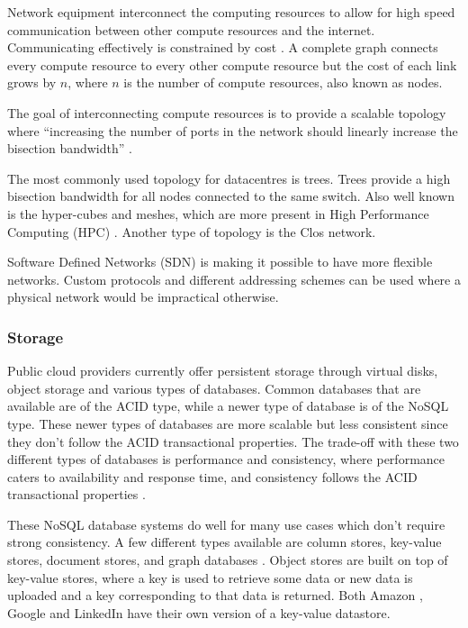 \documentclass[12pt]{article}
\begin{document}
Network equipment interconnect the computing resources to allow for high speed communication between other compute resources and the internet. Communicating effectively is constrained by cost \cite{Jennings2015}. A complete graph connects every compute resource to every other compute resource but the cost of each link grows by $n$, where $n$ is the number of compute resources, also known as nodes.

The goal of interconnecting compute resources is to provide a scalable topology where ``increasing the number of ports in the network should linearly increase the bisection bandwidth'' \cite{abts2012guided}.

The most commonly used topology for datacentres is trees. Trees provide a high bisection bandwidth for all nodes connected to the same switch. Also well known is the hyper-cubes and meshes, which are more present in High Performance Computing (HPC) \cite{Jennings2015}. Another type of topology is the Clos network. %

Software Defined Networks (SDN) is making it possible to have more flexible networks. Custom protocols and different addressing schemes can be used where a physical network would be impractical otherwise.

\subsubsection{Storage} \label{ssub:storage}


Public cloud providers currently offer persistent storage through virtual disks, object storage and various types of databases. Common databases that are available are of the ACID type, while a newer type of database is of the NoSQL type. These newer types of databases are more scalable but less consistent since they don't follow the ACID transactional properties. The trade-off with these two different types of databases is performance and consistency, where performance caters to availability and response time, and consistency follows the ACID transactional properties \cite{Jennings2015}.

These NoSQL database systems do well for many use cases which don't require strong consistency. A few different types available are column stores, key-value stores, document stores, and graph databases \cite{graphDB2013}. Object stores are built on top of key-value stores, where a key is used to retrieve some data or new data is uploaded and a key corresponding to that data is returned. Both Amazon \cite{dynamodb}, Google \cite{cassandra} and LinkedIn \cite{voldemort} have their own version of a key-value datastore.
\end{document}

